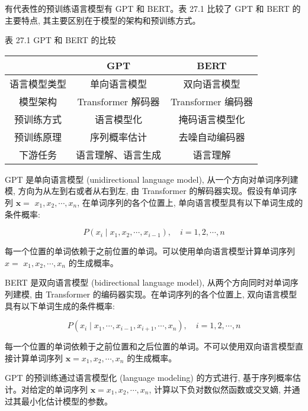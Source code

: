 \documentclass[10pt]{article}
\begin{document}
有代表性的预训练语言模型有 GPT 和 BERT。表 27.1 比较了 GPT 和 BERT 的主要特点, 其主要区别在于模型的架构和预训练方式。

表 27.1 GPT 和 BERT 的比较

\begin{center}
\begin{tabular}{c|c|c}
\hline
 & GPT & BERT \\
\hline
语言模型类型 & 单向语言模型 & 双向语言模型 \\
\hline
模型架构 & Transformer 解码器 & Transformer 编码器 \\
\hline
预训练方式 & 语言模型化 & 掩码语言模型化 \\
\hline
预训练原理 & 序列概率估计 & 去噪自动编码器 \\
\hline
下游任务 & 语言理解、语言生成 & 语言理解 \\
\hline
\end{tabular}
\end{center}

GPT 是单向语言模型 (unidirectional language model), 从一个方向对单词序列建模, 方向为从左到右或者从右到左, 由 Transformer 的解码器实现。假设有单词序列 $\boldsymbol{x}=$ $x_{1}, x_{2}, \cdots, x_{n}$, 在单词序列的各个位置上, 单向语言模型具有以下单词生成的条件概率:


\begin{equation*}
P\left(x_{i} \mid x_{1}, x_{2}, \cdots, x_{i-1}\right), \quad i=1,2, \cdots, n \tag{27.1}
\end{equation*}


每一个位置的单词依赖于之前位置的单词。可以使用单向语言模型计算单词序列 $x=$ $x_{1}, x_{2}, \cdots, x_{n}$ 的生成概率。

BERT 是双向语言模型 (bidirectional language model), 从两个方向同时对单词序列建模, 由 Transformer 的编码器实现。在单词序列的各个位置上, 双向语言模型具有以下单词生成的条件概率:


\begin{equation*}
P\left(x_{i} \mid x_{1}, \cdots, x_{i-1}, x_{i+1}, \cdots, x_{n}\right), \quad i=1,2, \cdots, n \tag{27.2}
\end{equation*}


每一个位置的单词依赖于之前位置和之后位置的单词。不可以使用双向语言模型直接计算单词序列 $\boldsymbol{x}=x_{1}, x_{2}, \cdots, x_{n}$ 的生成概率。

GPT 的预训练通过语言模型化 (language modeling) 的方式进行, 基于序列概率估计。对给定的单词序列 $\boldsymbol{x}=x_{1}, x_{2}, \cdots, x_{n}$, 计算以下负对数似然函数或交叉嫡, 并通过其最小化估计模型的参数。
\end{document}
